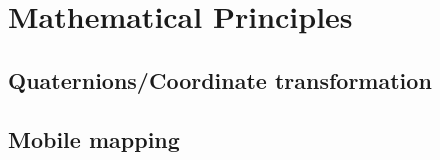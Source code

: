\chapter{Mathematical Principles}
\section{Quaternions/Coordinate transformation}
\section{Mobile mapping}

